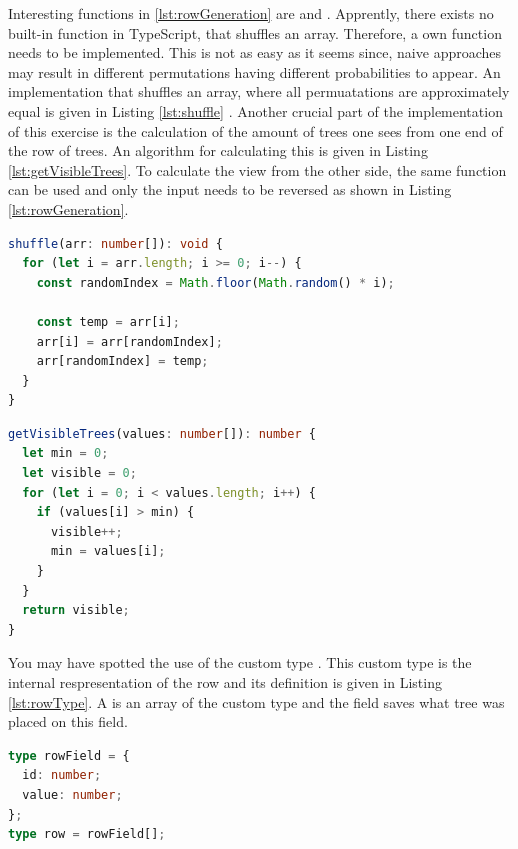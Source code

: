 Interesting functions in \ref{lst:rowGeneration} are  and . Apprently, there exists no built-in function in TypeScript, that shuffles an array. Therefore, a own function needs to be implemented. This is not as easy as it seems since, naive approaches may result in different permutations having different probabilities to appear. An implementation that shuffles an array, where all permuatations are approximately equal is given in Listing \ref{lst:shuffle} \cite{JavaScriptShuffle}.
Another crucial part of the implementation of this exercise is the calculation of the amount of trees one sees from one end of the row of trees. An algorithm for calculating this is given in Listing \ref{lst:getVisibleTrees}. To calculate the view from the other side, the same function can be used and only the input needs to be reversed as shown in Listing \ref{lst:rowGeneration}.

\begin{lstlisting}[language=TypeScript,caption={Algorithm to shuffle an array},label={lst:shuffle}]
shuffle(arr: number[]): void {
  for (let i = arr.length; i >= 0; i--) {
    const randomIndex = Math.floor(Math.random() * i);

    const temp = arr[i];
    arr[i] = arr[randomIndex];
    arr[randomIndex] = temp;
  }
}
\end{lstlisting}

\begin{lstlisting}[language=TypeScript,caption={Algorithm to calculate the amount of visible tree from one end},label={lst:getVisibleTrees}]
getVisibleTrees(values: number[]): number {
  let min = 0;
  let visible = 0;
  for (let i = 0; i < values.length; i++) {
    if (values[i] > min) {
      visible++;
      min = values[i];
    }
  }
  return visible;
}
\end{lstlisting}

You may have spotted the use of the custom type . This custom type is the internal respresentation of the row and its definition is given in Listing \ref{lst:rowType}. A  is an array of the custom type  and the field  saves what tree was placed on this field.

\begin{lstlisting}[language=TypeScript,caption={Definition of the custom row and rowField type},label={lst:rowType}]
type rowField = {
  id: number;
  value: number;
};
type row = rowField[];
\end{lstlisting}

